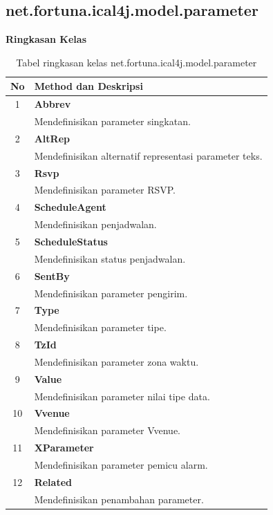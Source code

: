\subsection{net.fortuna.ical4j.model.parameter}
\label{subs:net.fortuna.ical4j.model.parameter}
	\noindent \textbf{Ringkasan Kelas}\cite{ical}
	\begin{table}[H]
		\centering
		\caption{Tabel ringkasan kelas net.fortuna.ical4j.model.parameter}
		\label{tab:kelas_net.fortuna.ical4j.model.parameter}
	\begin{tabular}{|c|p{12cm}|}
		\hline
		\textbf{No} & \textbf{Method dan Deskripsi} \\ \hline \hline
		1 & \textbf{Abbrev}\\
			&	Mendefinisikan parameter singkatan.\\ \hline
		2 & \textbf{AltRep}\\
			&	Mendefinisikan alternatif representasi parameter teks. \\ \hline
		3 & \textbf{Rsvp}\\
			&	Mendefinisikan parameter RSVP.\\ \hline
		4 & \textbf{ScheduleAgent}\\
			&	Mendefinisikan penjadwalan.\\ \hline
		5 & \textbf{ScheduleStatus}\\
			&	Mendefinisikan status penjadwalan.\\ \hline
		6 & \textbf{SentBy}\\
			&	Mendefinisikan parameter pengirim.\\ \hline
		7 & \textbf{Type}\\
			&	Mendefinisikan parameter tipe.\\ \hline
		8 & \textbf{TzId}\\
			&	Mendefinisikan parameter zona waktu.\\ \hline
		9 & \textbf{Value}\\
			&	Mendefinisikan parameter nilai tipe data.\\ \hline
		10 & \textbf{Vvenue}\\
			&	Mendefinisikan parameter Vvenue.\\ \hline
		11 & \textbf{XParameter}\\
			&	Mendefinisikan parameter pemicu alarm.\\ \hline
		12 & \textbf{Related}\\
			&	Mendefinisikan penambahan parameter.\\ \hline
	\end{tabular}
\end{table}

